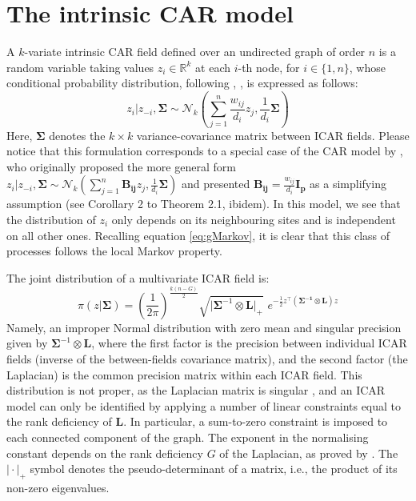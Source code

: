 \documentclass[openany, 11pt, oneside]{book}
\begin{document}
\section{The intrinsic CAR model} \label{section:icar}


A $k$-variate intrinsic CAR field defined over an undirected graph of order $n$ is a random variable taking values $z_i \in \mathbb{R}^k$ at each $i$-th node, for $i \in \{1, n\}$, whose conditional probability distribution, following \cite{Mardia}, \cite[see also][Chapter 10]{Banerjee}, is expressed as follows:
%
\begin{equation}
z_i \vert z_{-i}, \boldsymbol{\Sigma} \sim \mathcal{N}_k \left(\sum_{j=1}^{n} \frac{w_{ij}}{d_i}z_{j}, \frac{1}{d_i} \boldsymbol{\Sigma}\right)
\label{eq:icarconditional}
\end{equation}
%
Here, $\boldsymbol{\Sigma}$ denotes the $k \times k$ variance-covariance matrix between ICAR fields. Please notice that this formulation corresponds to a special case of the CAR model by \cite{Mardia}, who originally proposed the more general form $z_i \vert z_{-i}, \boldsymbol{\Sigma} \sim \mathcal{N}_k \left(\sum_{j=1}^{n} \boldsymbol{B_{ij}} z_{j}, \frac{1}{d_i} \boldsymbol{\Sigma} \right)$ and presented $\boldsymbol{B_{ij}} = \frac{w_{ij}}{d_i} \boldsymbol{I_p}$ as a simplifying assumption (see Corollary 2 to Theorem 2.1, ibidem). In this model, we see that the distribution of $z_i$ only depends on its neighbouring sites and is independent on all  other ones. Recalling equation \ref{eq:gMarkov}, it is clear that this class of processes follows the local Markov property.

The joint distribution of a multivariate ICAR field is:
%
\begin{equation}
\pi \left(z \vert \boldsymbol{\Sigma} \right)= 
\left( \frac{1}{2 \pi} \right)^{\frac{k(n - G)}{2}}
\sqrt{\lvert \boldsymbol{\Sigma}^{-1} \otimes
\boldsymbol{L} \rvert_+} 
\, \, e^{\displaystyle{-\tfrac{1}{2}
z^\top\left(\boldsymbol{\Sigma^{-1}} \otimes \boldsymbol{L} \right) z}}
\label{eq:icarjoint}
\end{equation}
%
Namely, an improper Normal distribution with zero mean and singular precision given by $\boldsymbol{\Sigma}^{-1} \otimes \boldsymbol{L}$, where the first factor is the precision between individual ICAR fields (inverse of the between-fields covariance matrix), and the second factor (the Laplacian) is the common precision matrix within each ICAR field. This distribution is not proper, as the Laplacian matrix is singular \parencite{ICAR, Hodges2003, Banerjee}, and an ICAR model can only be identified by applying a number of linear constraints equal to the rank deficiency of $\boldsymbol{L}$. In particular, a sum-to-zero constraint is imposed to each connected component of the graph. The exponent in the normalising constant depends on the rank deficiency $G$ of the Laplacian, as proved by \cite{Hodges2003}.  The $\vert \cdot\vert_+$ symbol denotes the pseudo-determinant of a matrix, i.e., the product of its non-zero eigenvalues. 
%
\end{document}
